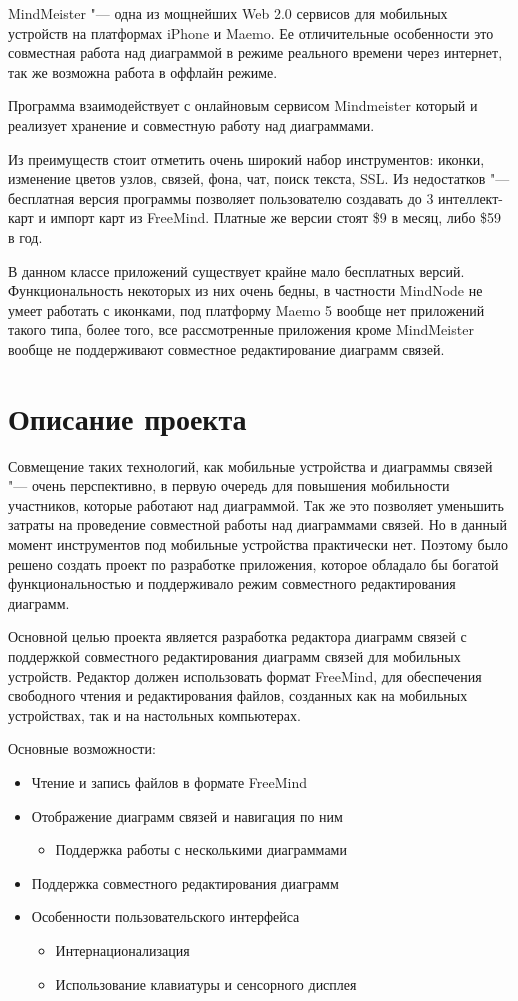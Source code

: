 MindMeister "--- одна из мощнейших Web 2.0 сервисов для мобильных устройств на
платформах iPhone и Maemo. Ее отличительные особенности это совместная работа
над диаграммой в режиме реального времени через интернет, так же возможна работа
в оффлайн режиме.

Программа взаимодействует с онлайновым сервисом Mindmeister который и реализует
хранение и совместную работу над диаграммами.

Из преимуществ стоит отметить очень широкий набор инструментов: иконки,
изменение цветов узлов, связей, фона, чат, поиск текста, SSL. Из недостатков
"--- бесплатная версия программы позволяет пользователю создавать до 3
интеллект-карт и импорт карт из FreeMind. Платные же версии стоят \$9 в месяц,
либо \$59 в год.

В данном классе приложений существует крайне мало бесплатных версий.
Функциональность некоторых из них очень бедны, в частности MindNode не умеет
работать с иконками, под платформу Maemo 5 вообще нет приложений такого типа,
более того, все рассмотренные приложения кроме MindMeister вообще не
поддерживают совместное редактирование диаграмм связей.

\section{Описание проекта}\label{sec:project_summary}

Совмещение таких технологий, как мобильные устройства и диаграммы связей "---
очень перспективно, в первую очередь для повышения мобильности участников,
которые работают над диаграммой. Так же это позволяет уменьшить затраты на
проведение совместной работы над диаграммами связей. Но в данный момент
инструментов под мобильные устройства практически нет. Поэтому было решено
создать проект по разработке приложения, которое обладало бы богатой
функциональностью и поддерживало режим совместного редактирования диаграмм.

Основной целью проекта является разработка редактора диаграмм связей с
поддержкой совместного редактирования диаграмм связей для мобильных устройств.
Редактор должен использовать формат FreeMind, для обеспечения свободного чтения
и редактирования файлов, созданных как на мобильных устройствах, так и на
настольных компьютерах.

Основные возможности:
\begin{itemize}
\item Чтение и запись файлов в формате FreeMind
\item Отображение диаграмм связей и навигация по ним
\begin{itemize}
\item Поддержка работы с несколькими диаграммами
\end{itemize}
\item Поддержка совместного редактирования диаграмм
\item Особенности пользовательского интерфейса
\begin{itemize}
\item Интернационализация
\item Использование клавиатуры и сенсорного дисплея
\end{itemize}
\end{itemize}

